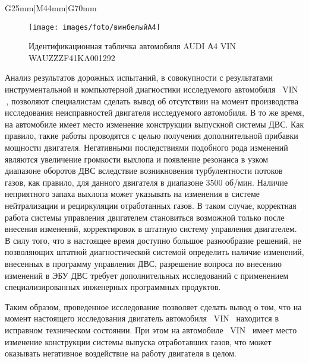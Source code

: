 \begin{longtable}{G{25mm}|M{44mm}|G{70mm}}
\begin{figure}[H]
	\centering
	\texttt{[image: images/foto/винбелыйА4]}
	\caption{Идентификационная табличка автомобиля  AUDI А4 VIN WAUZZZF41KA001292}
	\label{fig:4}
\end{figure}

\vspace{4mm}

Анализ результатов дорожных испытаний, в совокупности с результатами  инструментальной и компьютерной диагностики исследуемого автомобиля  \, VIN \vin\,, позволяют специалистам  сделать вывод об отсутствии на момент производства исследования неисправностей двигателя исследуемого автомобиля. В то же время, на автомобиле имеет место изменение конструкции выпускной системы ДВС. Как правило, такие работы проводятся с целью получения дополнительной прибавки мощности двигателя.  Негативными последствиями подобного рода изменений  являются увеличение громкости выхлопа и появление резонанса в узком диапазоне оборотов ДВС вследствие возникновения турбулентности потоков газов, как правило, для данного двигателя в диапазоне 3500 об/мин. Наличие неприятного запаха выхлопа может указывать на изменения в системе нейтрализации и рециркуляции  отработанных газов. В таком случае, корректная работа системы управления двигателем становиться возможной только после внесения изменений, корректировок в штатную систему управления двигателем. В силу того, что в настоящее время доступно большое разнообразие  решений, не позволяющих штатной диагностической системой определить наличие изменений, внесенных в программу управления ДВС, разрешение вопроса по внесению изменений в ЭБУ ДВС требует дополнительных исследований с применением специализированных инженерных программных  продуктов.  

Таким образом, проведенное исследование позволяет сделать вывод о том, что на момент настоящего исследования двигатель автомобиля  \, VIN \vin\, находится в исправном техническом состоянии. При этом  на автомобиле  \, VIN \vin\  имеет место изменение конструкции системы выпуска отработавших газов, что может оказывать негативное воздействие на работу двигателя в целом.

%



\end{longtable}
